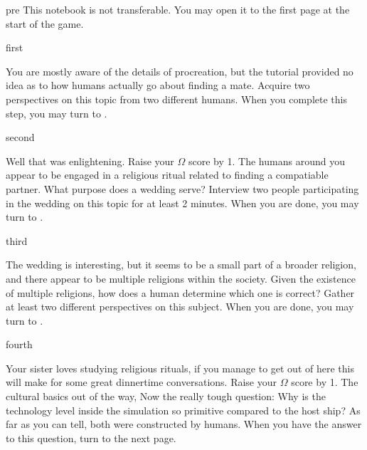 \documentclass[notebook]{guildcamp1}
\begin{document}

\startnotebook{\nAlienQuestions{}}

\begin{page}{pre}
This notebook is not transferable. You may open it to the first page at the start of the game.
\end{page}

\begin{page}{first}

You are mostly aware of the details of procreation, but the tutorial provided no idea as to how humans actually go about finding a mate.
Acquire two perspectives on this topic from two different humans. When you complete this step, you may turn to .

\end{page}

\begin{page}{second}

Well that was enlightening. Raise your $\Omega$ score by 1. The humans around you appear to be engaged in a religious ritual related to
finding a compatiable partner. What purpose does a wedding serve? Interview two people participating in the wedding on
this topic for at least 2 minutes. When you are done, you may turn to .

\end{page}

\begin{page}{third}

The wedding is interesting, but it seems to be a small part of a broader religion, and there appear to be multiple religions within the society.
Given the existence of multiple religions, how does a human determine which one is correct? Gather at least two different perspectives on this subject.
When you are done, you may turn to .

\end{page}

\begin{page}{fourth}

Your sister loves studying religious rituals, if you manage to get out of here this will make for some great dinnertime conversations.
Raise your $\Omega$ score by 1. The cultural basics out of the way, Now the really tough question: 
Why is the technology level inside the simulation so primitive compared to the host ship? As far as you can tell, both were constructed by humans.
When you have the answer to this question, turn to the next page.

\end{page}
\end{document}
